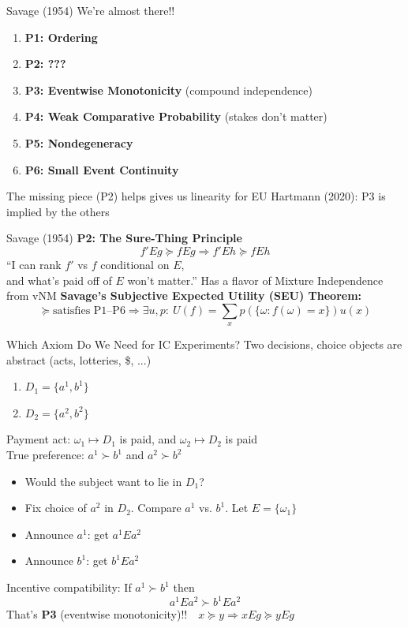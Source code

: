 \begin{frame}{Savage (1954)}
We're almost there!!
\begin{enumerate}
    \item \textbf{P1: Ordering}
    \item \textbf{P2: ???}
    \item \textbf{P3: Eventwise Monotonicity} (compound independence)
    \item \textbf{P4: Weak Comparative Probability} (stakes don't matter)
    \item \textbf{P5: Nondegeneracy}
    \item \textbf{P6: Small Event Continuity}
\end{enumerate}
\br
The missing piece (P2) helps gives us linearity for EU
\br
{\footnotesize Hartmann (2020): P3 is implied by the others}
\end{frame}

\begin{frame}{Savage (1954)}
\textbf{P2: The Sure-Thing Principle}
$$
    f'Eg \succeq fEg \Rightarrow f'Eh \succeq fEh
$$
``I can rank $f'$ vs $f$ conditional on $E$,\\
and what's paid off of $E$ won't matter.''
\br
Has a flavor of Mixture Independence from vNM
\br
\textbf{Savage's Subjective Expected Utility (SEU) Theorem:}
$$
    \succeq \text{satisfies P1--P6} \Rightarrow \exists u,p :\ U(f) = \sum_x p(\{\omega:f(\omega)=x\})u(x)
$$
\end{frame}


\begin{frame}{Which Axiom Do We Need for IC Experiments?}
Two decisions, choice objects are abstract (acts, lotteries, \$, ...)
\begin{enumerate}
    \item $D_1=\{a^1,b^1\}$
    \item $D_2=\{a^2,b^2\}$
\end{enumerate}
Payment act: $\omega_1 \mapsto D_1$ is paid, and $\omega_2\mapsto D_2$ is paid\\
True preference: $a^1\succ b^1$ and $a^2\succ b^2$
\begin{itemize}
    \item Would the subject want to lie in $D_1$?
    \item Fix choice of $a^2$ in $D_2$. Compare $a^1$ vs. $b^1$. Let $E=\{\omega_1\}$
    \item Announce $a^1$: get $a^1 E a^2$
    \item Announce $b^1$: get $b^1 E a^2$
\end{itemize}
Incentive compatibility: If $a^1\succ b^1$ then
$$
    a^1 E a^2 \succ b^1 E a^2
$$
\br
That's \textbf{P3} (eventwise monotonicity)!!\ \ $x\succeq y\Rightarrow xEg\succeq yEg$
\end{frame}

